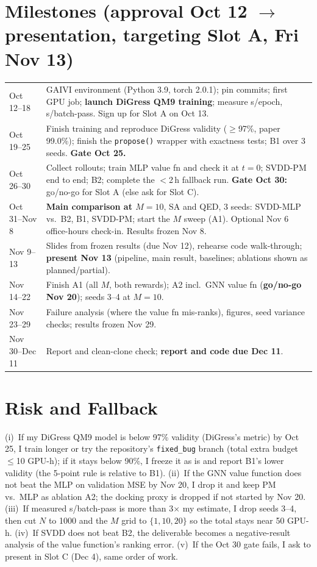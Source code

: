 \documentclass[10pt]{article}
\begin{document}
\normalsize\section{Milestones (approval Oct 12 $\to$ presentation, targeting Slot A, Fri Nov 13)}
\begin{tabular}{@{}p{1.15in}p{5.7in}@{}}
Oct 12--18 & GAIVI environment (Python 3.9, torch 2.0.1); pin commits; first GPU job; \textbf{launch DiGress QM9 training}; measure s/epoch, s/batch-pass. Sign up for Slot A on Oct 13.\\
Oct 19--25 & Finish training and reproduce DiGress validity ($\ge$97\%, paper 99.0\%); finish the \texttt{propose()} wrapper with exactness tests; B1 over 3 seeds. \textbf{Gate Oct 25.}\\
Oct 26--30 & Collect rollouts; train MLP value fn and check it at $t{=}0$; SVDD-PM end to end; B2; complete the $<$2\,h fallback run. \textbf{Gate Oct 30:} go/no-go for Slot A (else ask for Slot C).\\
Oct 31--Nov 8 & \textbf{Main comparison at $M{=}10$}, SA and QED, 3 seeds: SVDD-MLP vs.\ B2, B1, SVDD-PM; start the $M$ sweep (A1). Optional Nov 6 office-hours check-in. Results frozen Nov 8.\\
Nov 9--13 & Slides from frozen results (due Nov 12), rehearse code walk-through; \textbf{present Nov 13} (pipeline, main result, baselines; ablations shown as planned/partial).\\
Nov 14--22 & Finish A1 (all $M$, both rewards); A2 incl.\ GNN value fn (\textbf{go/no-go Nov 20}); seeds 3--4 at $M{=}10$.\\
Nov 23--29 & Failure analysis (where the value fn mis-ranks), figures, seed variance checks; results frozen Nov 29.\\
Nov 30--Dec 11 & Report and clean-clone check; \textbf{report and code due Dec 11}.\\
\end{tabular}

\section{Risk and Fallback}\small
(i)~If my DiGress QM9 model is below 97\% validity (DiGress's metric) by Oct 25, I train longer or try the repository's \texttt{fixed\_bug} branch (total extra budget $\le$10 GPU-h); if it stays below 90\%, I freeze it as is and report B1's lower validity (the 5-point rule is relative to B1). (ii)~If the GNN value function does not beat the MLP on validation MSE by Nov 20, I drop it and keep PM vs.\ MLP as ablation A2; the docking proxy is dropped if not started by Nov 20. (iii)~If measured s/batch-pass is more than 3$\times$ my estimate, I drop seeds 3--4, then cut $N$ to 1000 and the $M$ grid to $\{1,10,20\}$ so the total stays near 50 GPU-h. (iv)~If SVDD does not beat B2, the deliverable becomes a negative-result analysis of the value function's ranking error. (v)~If the Oct 30 gate fails, I ask to present in Slot C (Dec 4), same order of work.
\end{document}
